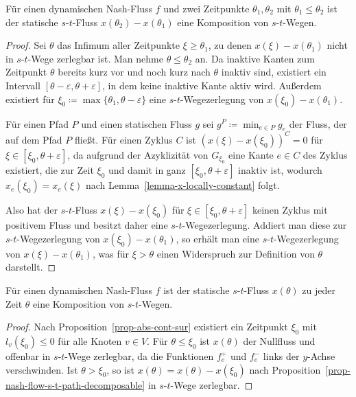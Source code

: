 \begin{proposition}\label{prop-nash-flow-s-t-path-decomposable}
	Für einen dynamischen Nash-Fluss $f$ und zwei Zeitpunkte $\theta_1,\theta_2$ mit $\theta_1 \leq \theta_2$ ist der statische $s$-$t$-Fluss $x(\theta_2) - x(\theta_1)$ eine Komposition von $s$-$t$-Wegen.
\end{proposition}
\begin{proof}
	Sei $\theta$ das Infimum aller Zeitpunkte $\xi\geq\theta_1$, zu denen $x(\xi) - x(\theta_1)$ nicht in $s$-$t$-Wege zerlegbar ist.
	Man nehme $\theta \leq \theta_2$ an.
	Da inaktive Kanten zum Zeitpunkt $\theta$ bereits kurz vor und noch kurz nach $\theta$ inaktiv sind, existiert ein Intervall $[\theta - \varepsilon, \theta + \varepsilon]$, in dem keine inaktive Kante aktiv wird.
	Außerdem existiert für $\xi_0 \coloneq \max \{ \theta_1, \theta - \varepsilon \}$ eine $s$-$t$-Wegezerlegung von $x(\xi_0) - x(\theta_1)$.
	
	Für einen Pfad $P$ und einen statischen Fluss $g$ sei $g^P \coloneq \min_{e\in P} g_e$ der Fluss, der auf dem Pfad $P$ fließt.
	Für einen Zyklus $C$ ist $(x(\xi) - x(\xi_0))^C = 0$ für $\xi\in [\xi_0, \theta+\varepsilon]$, da aufgrund der Azyklizität von $G_{\xi_0}$ eine Kante $e\in C$ des Zyklus existiert, die zur Zeit $\xi_0$ und damit in ganz $[\xi_0, \theta+\varepsilon]$ inaktiv ist, wodurch $x_e(\xi_0) = x_e(\xi)$ nach Lemma~\ref{lemma-x-locally-constant} folgt.
	
	Also hat der $s$-$t$-Fluss $x(\xi) - x(\xi_0)$ für $\xi\in [\xi_0, \theta + \varepsilon]$ keinen Zyklus mit positivem Fluss und besitzt daher eine $s$-$t$-Wegezerlegung.
	Addiert man diese zur $s$-$t$-Wegezerlegung von $x(\xi_0) - x(\theta_1)$, so erhält man eine $s$-$t$-Wegezerlegung von $x(\xi) - x(\theta_1)$, was für $\xi > \theta$ einen Widerspruch zur Definition von $\theta$ darstellt.
\end{proof}

\begin{corollary}
	Für einen dynamischen Nash-Fluss $f$ ist der statische $s$-$t$-Fluss $x(\theta)$ zu jeder Zeit $\theta$ eine Komposition von $s$-$t$-Wegen.
\end{corollary}
\begin{proof}
	Nach Proposition~\ref{prop-abs-cont-sur} existiert ein Zeitpunkt $\xi_0$ mit $l_v(\xi_0) \leq 0$ für alle Knoten $v\in V$.
	Für $\theta \leq \xi_0$ ist $x(\theta)$ der Nullfluss und offenbar in $s$-$t$-Wege zerlegbar, da die Funktionen $f_e^+$ und $f_e^-$ links der $y$-Achse verschwinden.
	Ist $\theta > \xi_0$,  so ist $x(\theta)= x(\theta) - x(\xi_0)$ nach Proposition~\ref{prop-nash-flow-s-t-path-decomposable} in $s$-$t$-Wege zerlegbar.
\end{proof}